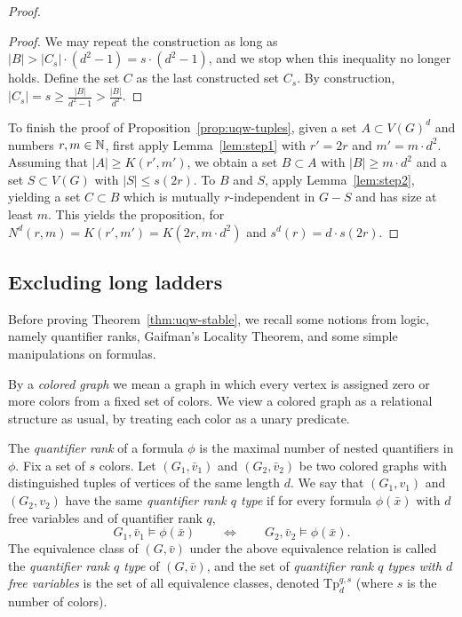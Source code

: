 \begin{proof}
\begin{proof}
We may repeat the construction as long as $|B|>|C_s|\cdot (d^2-1)=s\cdot (d^2-1)$, and we stop when this inequality no longer holds. Define the set $C$ as the last constructed set $C_s$.
By construction, $|C_s|=s\ge 
\frac{|B|}{d^2-1}>\frac{|B|}{d^2}$.	
\end{proof}

To finish the proof of Proposition~\ref{prop:uqw-tuples},
given a set $A\subset V(G)^d$ and numbers $r,m\in\mathbb{N}$,
first apply 
Lemma~\ref{lem:step1} 
  with $r'=2r$ and
 $m'= m\cdot d^2$.
 Assuming that $|A|\ge K(r',m')$, 
we obtain a set $B\subset A$ with $|B|\ge m\cdot d^2$ and a set $S\subset V(G)$ with $|S|\le s(2r)$.
To $B$ and $S$, apply Lemma~\ref{lem:step2}, yielding a set $C\subset B$ which is mutually $r$-independent in $G-S$ and has size at least $m$. This yields the proposition, for $N^d(r,m)=K(r',m')=K(2r,m\cdot d^2)$
and $s^d(r)=d\cdot s(2r)$.
\end{proof}


\subsection{Excluding long ladders}
\label{sec:uqw-stable}

Before  proving Theorem~\ref{thm:uqw-stable}, we recall some notions from logic, namely quantifier ranks, Gaifman's Locality Theorem, and some simple manipulations on formulas.


By a \emph{colored graph} we mean a graph  in which 
every vertex is assigned zero or more colors from a fixed set of colors. We view a colored graph as a relational structure as usual, by treating each color as a unary predicate. 

The \emph{quantifier rank} of a formula $\phi$ is the maximal number of nested quantifiers in $\phi$. Fix a set of $s$ colors.
Let $(G_1,\bar v_1)$ and $(G_2,\bar v_2)$ be two
colored graphs with distinguished tuples of vertices of the same length $d$. We say that $(G_1,v_1)$ and $(G_2,v_2)$
have the same \emph{quantifier rank $q$ type}
if for every formula $\phi(\bar x)$ with $d$ free variables and of quantifier rank $q$,
 $$G_1,\bar v_1\models \phi(\bar x)\qquad\iff \qquad G_2,\bar v_2\models \phi(\bar x).$$
 The equivalence class of $(G,\bar v)$ under the above equivalence relation is called the \emph{quantifier rank $q$ type} of $(G,\bar v)$, and  the set of \emph{quantifier rank $q$ types with $d$ free variables}
is the set of all equivalence classes, denoted
$\mathrm{Tp}^{q,s}_d$ (where $s$ is the number of colors).

